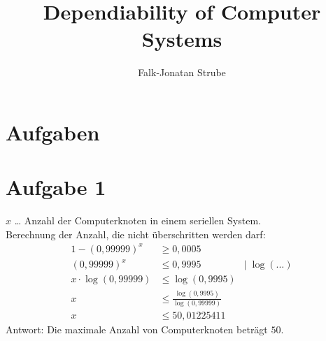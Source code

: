 \documentclass{scrartcl}
\title{Dependiability of Computer Systems}
\author{Falk-Jonatan Strube}
\begin{document}
\maketitle
\tableofcontents

\section*{Aufgaben}
\begin{center}
\end{center}

\section{Aufgabe 1}
$x$ … Anzahl der Computerknoten in einem seriellen System.\\
Berechnung der Anzahl, die nicht überschritten werden darf:
\begin{align*}
1-(0,99999)^x &\geq 0,0005\\
(0,99999)^x &\leq 0,9995 &|\; \log(...)\\
x\cdot \log(0,99999) &\leq \log(0,9995)\\
x &\leq \frac{\log(0,9995)}{\log(0,99999)}\\
x &\leq 50,01225411
\end{align*}
Antwort: Die maximale Anzahl von Computerknoten beträgt $50$.
\end{document}
